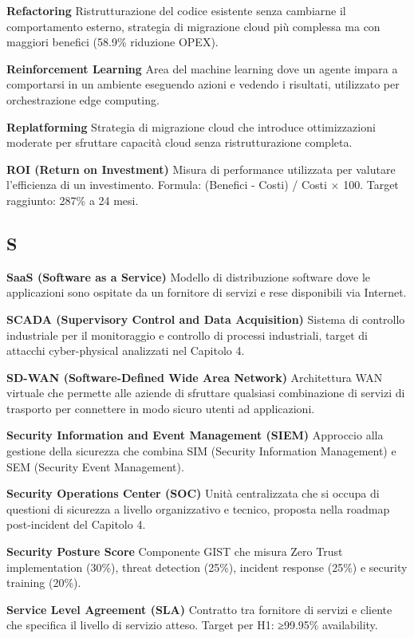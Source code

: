 \documentclass{report}
\begin{document}
\textbf{Refactoring} Ristrutturazione del codice esistente senza
cambiarne il comportamento esterno, strategia di migrazione cloud più
complessa ma con maggiori benefici (58.9\% riduzione OPEX).

\textbf{Reinforcement Learning} Area del machine learning dove un agente
impara a comportarsi in un ambiente eseguendo azioni e vedendo i
risultati, utilizzato per orchestrazione edge computing.

\textbf{Replatforming} Strategia di migrazione cloud che introduce
ottimizzazioni moderate per sfruttare capacità cloud senza
ristrutturazione completa.

\textbf{ROI (Return on Investment)} Misura di performance utilizzata per
valutare l'efficienza di un investimento. Formula: (Benefici - Costi) /
Costi × 100. Target raggiunto: 287\% a 24 mesi.

\subsection{S}\label{s}

\textbf{SaaS (Software as a Service)} Modello di distribuzione software
dove le applicazioni sono ospitate da un fornitore di servizi e rese
disponibili via Internet.

\textbf{SCADA (Supervisory Control and Data Acquisition)} Sistema di
controllo industriale per il monitoraggio e controllo di processi
industriali, target di attacchi cyber-physical analizzati nel Capitolo
4.

\textbf{SD-WAN (Software-Defined Wide Area Network)} Architettura WAN
virtuale che permette alle aziende di sfruttare qualsiasi combinazione
di servizi di trasporto per connettere in modo sicuro utenti ad
applicazioni.

\textbf{Security Information and Event Management (SIEM)} Approccio alla
gestione della sicurezza che combina SIM (Security Information
Management) e SEM (Security Event Management).

\textbf{Security Operations Center (SOC)} Unità centralizzata che si
occupa di questioni di sicurezza a livello organizzativo e tecnico,
proposta nella roadmap post-incident del Capitolo 4.

\textbf{Security Posture Score} Componente GIST che misura Zero Trust
implementation (30\%), threat detection (25\%), incident response (25\%)
e security training (20\%).

\textbf{Service Level Agreement (SLA)} Contratto tra fornitore di
servizi e cliente che specifica il livello di servizio atteso. Target
per H1: ≥99.95\% availability.
\end{document}
